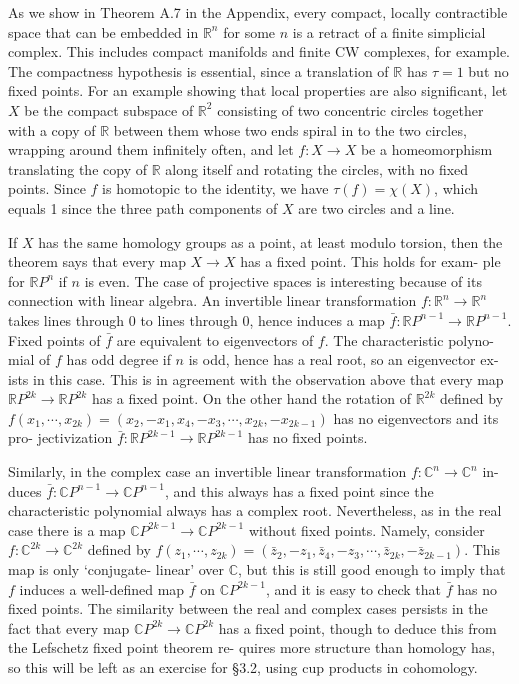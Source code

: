 As we show in Theorem A.7 in the Appendix, every compact, locally contractible space that can be embedded in $\mathbb{R}^n$ for some $n$ is a retract of a finite simplicial complex. This includes compact manifolds and finite CW complexes, for example. The compactness hypothesis is essential, since a translation of $\mathbb{R}$ has $\tau = 1$ but no fixed points. For an example showing that local properties are also significant, let $X$ be the compact subspace of $\mathbb{R}^2$ consisting of two concentric circles together with a copy of $\mathbb{R}$ between them whose two ends spiral in to the two circles, wrapping around them infinitely often, and let $f: X \to X$ be a homeomorphism translating the copy of $\mathbb{R}$ along itself and rotating the circles, with no fixed points. Since $f$ is homotopic to the identity, we have $\tau(f) = \chi(X)$, which equals 1 since the three path components of $X$ are two circles and a line.



If $X$ has the same homology groups as a point, at least modulo torsion, then
the theorem says that every map $X \to X$ has a fixed point. This holds for exam-
ple for $\mathbb{R}P^n$ if $n$ is even. The case of projective spaces is interesting because of
its connection with linear algebra. An invertible linear transformation $f: \mathbb{R}^n \to \mathbb{R}^n$
takes lines through $0$ to lines through $0$, hence induces a map $\bar{f}: \mathbb{R}P^{n-1} \to \mathbb{R}P^{n-1}$.
Fixed points of $\bar{f}$ are equivalent to eigenvectors of $f$. The characteristic polyno-
mial of $f$ has odd degree if $n$ is odd, hence has a real root, so an eigenvector ex-
ists in this case. This is in agreement with the observation above that every map
$\mathbb{R}P^{2k} \to \mathbb{R}P^{2k}$ has a fixed point. On the other hand the rotation of $\mathbb{R}^{2k}$ defined by
$f(x_1, \cdots, x_{2k}) = (x_2, -x_1, x_4, -x_3, \cdots, x_{2k}, -x_{2k-1})$ has no eigenvectors and its pro-
jectivization $\bar{f}: \mathbb{R}P^{2k-1} \to \mathbb{R}P^{2k-1}$ has no fixed points.

Similarly, in the complex case an invertible linear transformation $f: \mathbb{C}^n \to \mathbb{C}^n$ in-
duces $\bar{f}: \mathbb{C}P^{n-1} \to \mathbb{C}P^{n-1}$, and this always has a fixed point since the characteristic
polynomial always has a complex root. Nevertheless, as in the real case there is a
map $\mathbb{C}P^{2k-1} \to \mathbb{C}P^{2k-1}$ without fixed points. Namely, consider $f: \mathbb{C}^{2k} \to \mathbb{C}^{2k}$ defined
by $f(z_1, \cdots, z_{2k}) = (\bar{z}_2, -z_1, \bar{z}_4, -z_3, \cdots, \bar{z}_{2k}, -\bar{z}_{2k-1})$. This map is only `conjugate-
linear' over $\mathbb{C}$, but this is still good enough to imply that $f$ induces a well-defined
map $\bar{f}$ on $\mathbb{C}P^{2k-1}$, and it is easy to check that $\bar{f}$ has no fixed points. The similarity
between the real and complex cases persists in the fact that every map $\mathbb{C}P^{2k} \to \mathbb{C}P^{2k}$
has a fixed point, though to deduce this from the Lefschetz fixed point theorem re-
quires more structure than homology has, so this will be left as an exercise for \S 3.2,
using cup products in cohomology.

